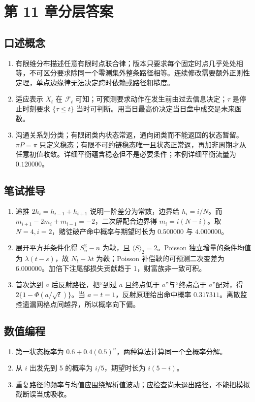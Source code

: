\chapter{第 11 章分层答案}
\label{app:ch11-solutions}

\section*{口述概念}
\begin{enumerate}[leftmargin=*]
  \item 有限维分布描述任意有限时点联合律；版本只要求每个固定时点几乎处处相等，不可区分要求除同一个零测集外整条路径相等。连续修改需要额外正则性定理，单点边缘律无法决定跨时依赖或路径粗糙度。
  \item 适应表示 $X_t$ 在 $\mathcal F_t$ 可知；可预测要求动作在发生前由过去信息决定；$\tau$ 是停止时刻要求 $\{\tau\le t\}$ 当时可判断。用当日最高价决定当日盘中成交是未来函数。
  \item 沟通关系划分类；有限闭类内状态常返，通向闭类而不能返回的状态暂留。$\pi P=\pi$ 只定义稳态；有限不可约链稳态唯一且状态正常返，再加非周期才从任意初值收敛。详细平衡蕴含稳态但不是必要条件；本例详细平衡流量为 $0.120000$。
\end{enumerate}

\section*{笔试推导}
\begin{enumerate}[leftmargin=*,start=4]
  \item 递推 $2h_i=h_{i-1}+h_{i+1}$ 说明一阶差分为常数，边界给 $h_i=i/N$。而 $m_{i+1}-2m_i+m_{i-1}=-2$，二次解配合边界得 $m_i=i(N-i)$。取 $N=4,i=2$，赌徒破产命中概率与期望时长为 $0.500000$ 与 $4.000000$。
  \item 展开平方并条件化得 $S_n^2-n$ 为鞅，且 $\langle S\rangle_2=2$。Poisson 独立增量的条件均值为 $\lambda(t-s)$，故 $N_t-\lambda t$ 为鞅；Poisson 补偿鞅的可预测二次变差为 $6.000000$。加倍下注尾部损失贡献趋于 1，财富族非一致可积。
  \item 首次达到 $a$ 后反射路径，把“到过 $a$ 且终点低于 $a$”与“终点高于 $a$”配对，得 $2\{1-\Phi(a/\sqrt t)\}$。当 $a=t=1$，反射原理给出命中概率 $0.317311$。离散监控遗漏网格点间越界，所以概率向下偏。
\end{enumerate}

\section*{数值编程}
\begin{enumerate}[leftmargin=*]
  \item 第一状态概率为 $0.6+0.4(0.5)^n$，两种算法计算同一个全概率分解。
  \item 从 $i$ 出发先到 5 的概率为 $i/5$，期望时长为 $i(5-i)$。
  \item 重复路径的频率与均值应围绕解析值波动；应检查尚未退出路径，不能把模拟截断误当成吸收。
\end{enumerate}

